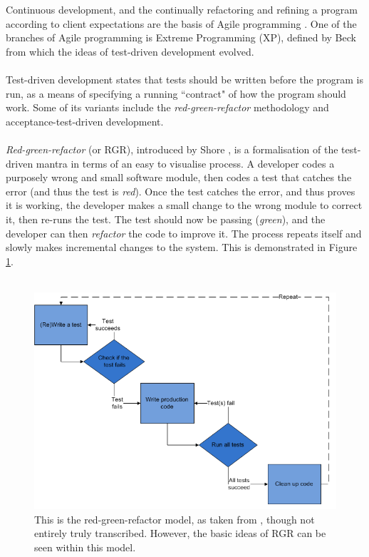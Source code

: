 Continuous development, and the continually refactoring and refining a program according to client
expectations are the basis of Agile programming \cite{sommerville1989software}.
One of the branches of Agile programming is Extreme Programming (XP), defined by Beck
\cite{beck2006extreme} from which the ideas of test-driven development evolved.\\
\\
Test-driven development states that tests should be written before the program is run, as a means of
specifying a running ``contract" of how the program should work.
Some of its variants include the {\em red-green-refactor} methodology and acceptance-test-driven
development.\\
\\
{\em Red-green-refactor} (or RGR), introduced by Shore \cite{shore2005RGR}, is a formalisation of the test-driven mantra in
terms of an easy to visualise process.
A developer codes a purposely wrong and small software module, then codes a test that catches the
error (and thus the test is {\em red}).
Once the test catches the error, and thus proves it is working, the developer makes a small change
to the wrong module to correct it, then re-runs the test.
The test should now be passing ({\em green}), and the developer can then {\em refactor} the code to
improve it.
The process repeats itself and slowly makes incremental changes to the system.
This is demonstrated in Figure \ref{figure:RGR}.\\
\\
\begin{figure}
\centering
\includegraphics[scale=0.6]{media/Test-driven_development}
\caption{This is the red-green-refactor model, as taken from \cite{RGR:image}, though not entirely
truly transcribed.
However, the basic ideas of RGR can be seen within this model.}
\label{figure:RGR}
\end{figure}
